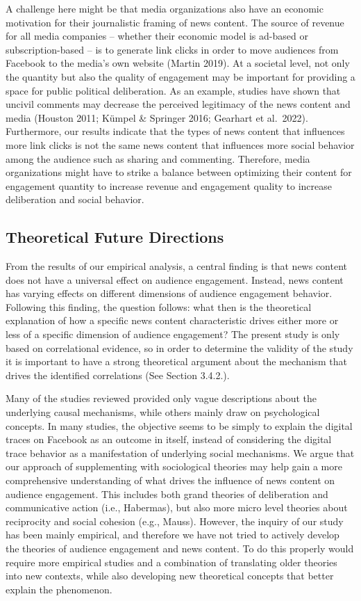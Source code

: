\documentclass[
]{article}
\begin{document}
A challenge here might be that media organizations also have an economic
motivation for their journalistic framing of news content. The source of
revenue for all media companies -- whether their economic model is
ad-based or subscription-based -- is to generate link clicks in order to
move audiences from Facebook to the media's own website (Martin 2019).
At a societal level, not only the quantity but also the quality of
engagement may be important for providing a space for public political
deliberation. As an example, studies have shown that uncivil comments
may decrease the perceived legitimacy of the news content and media
(Houston 2011; Kümpel \& Springer 2016; Gearhart et al.~2022).
Furthermore, our results indicate that the types of news content that
influences more link clicks is not the same news content that influences
more social behavior among the audience such as sharing and commenting.
Therefore, media organizations might have to strike a balance between
optimizing their content for engagement quantity to increase revenue and
engagement quality to increase deliberation and social behavior.

\hypertarget{theoretical-future-directions}{%
\subsection{Theoretical Future
Directions}\label{theoretical-future-directions}}

From the results of our empirical analysis, a central finding is that
news content does not have a universal effect on audience engagement.
Instead, news content has varying effects on different dimensions of
audience engagement behavior. Following this finding, the question
follows: what then is the theoretical explanation of how a specific news
content characteristic drives either more or less of a specific
dimension of audience engagement? The present study is only based on
correlational evidence, so in order to determine the validity of the
study it is important to have a strong theoretical argument about the
mechanism that drives the identified correlations (See Section 3.4.2.).

Many of the studies reviewed provided only vague descriptions about the
underlying causal mechanisms, while others mainly draw on psychological
concepts. In many studies, the objective seems to be simply to explain
the digital traces on Facebook as an outcome in itself, instead of
considering the digital trace behavior as a manifestation of underlying
social mechanisms. We argue that our approach of supplementing with
sociological theories may help gain a more comprehensive understanding
of what drives the influence of news content on audience engagement.
This includes both grand theories of deliberation and communicative
action (i.e., Habermas), but also more micro level theories about
reciprocity and social cohesion (e.g., Mauss). However, the inquiry of
our study has been mainly empirical, and therefore we have not tried to
actively develop the theories of audience engagement and news content.
To do this properly would require more empirical studies and a
combination of translating older theories into new contexts, while also
developing new theoretical concepts that better explain the phenomenon.
\end{document}
